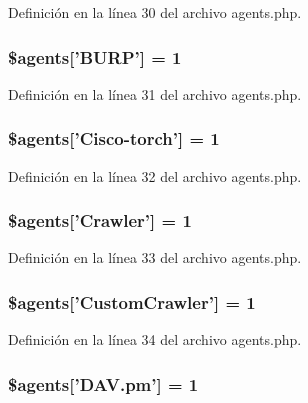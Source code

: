 Definición en la línea 30 del archivo agents.\-php.

\hypertarget{agents_8php_a9712cdf0164e983f6ef4f444606de781}{
\subsubsection[{\$agents}]{\setlength{\rightskip}{0pt plus 5cm}\$agents\mbox{[}'B\-U\-R\-P'\mbox{]} = 1}}\label{agents_8php_a9712cdf0164e983f6ef4f444606de781}


Definición en la línea 31 del archivo agents.\-php.

\hypertarget{agents_8php_ab72b611bef7a9467d61552378946db2e}{
\subsubsection[{\$agents}]{\setlength{\rightskip}{0pt plus 5cm}\$agents\mbox{[}'Cisco-\/torch'\mbox{]} = 1}}\label{agents_8php_ab72b611bef7a9467d61552378946db2e}


Definición en la línea 32 del archivo agents.\-php.

\hypertarget{agents_8php_a85ac9db2537a73d053c3c22374fe7d57}{
\subsubsection[{\$agents}]{\setlength{\rightskip}{0pt plus 5cm}\$agents\mbox{[}'Crawler'\mbox{]} = 1}}\label{agents_8php_a85ac9db2537a73d053c3c22374fe7d57}


Definición en la línea 33 del archivo agents.\-php.

\hypertarget{agents_8php_a50d6c7990c1746629329c7deff0fa8cc}{
\subsubsection[{\$agents}]{\setlength{\rightskip}{0pt plus 5cm}\$agents\mbox{[}'Custom\-Crawler'\mbox{]} = 1}}\label{agents_8php_a50d6c7990c1746629329c7deff0fa8cc}


Definición en la línea 34 del archivo agents.\-php.

\hypertarget{agents_8php_a51eb23f65a8cb7571c54a139414d0a04}{
\subsubsection[{\$agents}]{\setlength{\rightskip}{0pt plus 5cm}\$agents\mbox{[}'D\-A\-V.\-pm'\mbox{]} = 1}}\label{agents_8php_a51eb23f65a8cb7571c54a139414d0a04}


